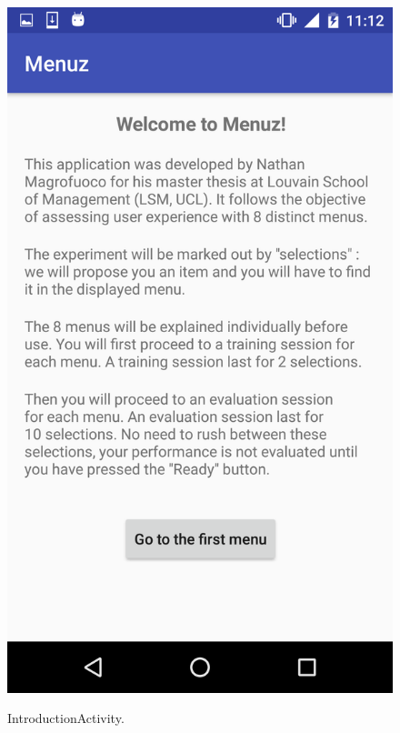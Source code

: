 \newpage

\begin{figure}[!ht]
  \begin{center}
    \includegraphics[scale=0.22]{img/intro_activity.png}
    \label{fig:intro_activity}
    \caption{IntroductionActivity.}
  \end{center}
\end{figure}

\newpage

